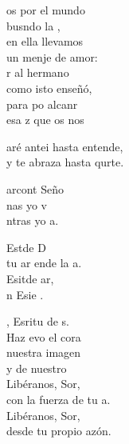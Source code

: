 \documentclass[12pt]{article}
\begin{document}
\begin{multicols*}{2}
\begin{cancion}%
	os por el mundo\\
	busndo la ,\\
en ella llevamos\\
	un menje de amor:\\
	r al hermano\\
	como isto enseñó,\\
	para po alcanr\\
	esa z que os nos \\
\end{cancion}%

\begin{cancion}%
	aré antei hasta entende,\\
	y te abraza hasta qurte.\\
\end{cancion}%

\begin{cancion}%
	arcont Seño\\
	nas yo v\\
	ntras yo a.\\
\end{cancion}%

\begin{cancion}%
	 Estde D\\
	 tu ar ende la a.\\
	 Esitde ar,\\
	n Esie .\\
\end{cancion}%

\begin{cancion}%
	, Esritu de s. \\
	Haz evo el cora\\
	nuestra imagen\\
	y de nuestro \\
	Libéranos, Sor, \\
	con la fuerza de tu a.\\
	Libéranos, Sor, \\
	desde tu propio azón.\\
\end{cancion}%


\end{multicols*}
\end{document}
